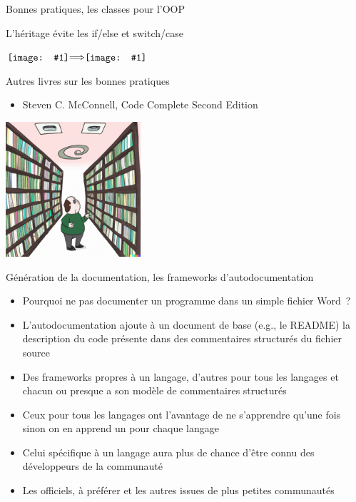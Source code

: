 \documentclass{beamer}
\newcommand*{\vcenterimage}[1]{\vcenter{\hbox{\texttt{[image: \#1]}}}}
\newcommand*{\vcenterarrow}{\vcenter{\hbox{$\Longrightarrow$}}}
\begin{document}
    \begin{frame}{Bonnes pratiques, les classes pour l'OOP}

        L'héritage évite les if/else et switch/case

        \centering

        $\vcenterimage{image/if-else}\vcenterarrow\vcenterimage{image/inheritance-bird}$

    \end{frame}

    \begin{frame}{Autres livres sur les bonnes pratiques}

        \begin{itemize}

            \item Steven C. McConnell, Code Complete Second Edition
        \end{itemize}
        \bigbreak

        \centering
        \includegraphics[width=5cm]{image/an-inifinity-of-books}

    \end{frame}

    \begin{frame}{Génération de la documentation, les frameworks d'autodocumentation}

        \begin{itemize}

            \item Pourquoi ne pas documenter un programme dans un simple fichier Word~?
            \item L'autodocumentation ajoute à un document de base (e.g., le README) la description du code présente dans des commentaires structurés du fichier source
            \item Des frameworks propres à un langage, d'autres pour tous les langages et chacun ou presque a son modèle de commentaires structurés
            \item Ceux pour tous les langages ont l'avantage de ne s'apprendre qu'une fois sinon on en apprend un pour chaque langage
            \item Celui spécifique à un langage aura plus de chance d'être connu des développeurs de la communauté
            \item Les officiels, à préférer et les autres issues de plus petites communautés
        \end{itemize}

    \end{frame}
\end{document}
